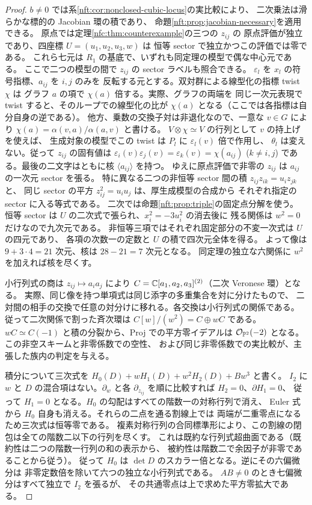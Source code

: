 \begin{proof}
$b\ne0$ では系\ref{nft:cor:nonclosed-cubic-locus}の実比較により、
二次乗法は滑らかな標的の Jacobian 環の積であり、
命題\ref{nft:prop:jacobian-necessary}を適用できる。
原点では定理\ref{nfc:thm:counterexample}の三つの $z_{ij}$ の
原点評価が独立であり、四座標 $U=(u_1,u_2,u_3,w)$ は
恒等 sector で独立かつこの評価では零である。
これら七元は $R_1$ の基底で、いずれも同定理の模型で偶な中心元である。
ここで二つの模型の間で $z_{ij}$ の sector ラベルも照合できる。
$\varepsilon_l$ を $x_l$ の符号指標、$a_{ij}$ を $i,j$ のみを
反転する元とする。双対群による線型化の指標 twist $\chi$ は
グラフ $a$ の項で $\chi(a)$ 倍する。実際、グラフの両端を
同じ一次元表現で twist すると、そのループでの線型化の比が
$\chi(a)$ となる（ここでは各指標は自分自身の逆である）。
他方、乗数の交換子対は非退化なので、一意な $v\in G$ により
$\chi(a)=\alpha(v,a)/\alpha(a,v)$ と書ける。
$V\otimes\chi\simeq V$ の行列として $v$ の持上げを使えば、
生成対象の模型でこの twist は $P_l$ に $\varepsilon_l(v)$ 倍で作用し、
$\theta_l$ は変えない。従って $z_{ij}$ の固有値は
$\varepsilon_i(v)\varepsilon_j(v)=\varepsilon_k(v)=\chi(a_{ij})$
($k\ne i,j$) である。最後の二文字はともに核 $\langle a_{ij}\rangle$ を持つ。
ゆえに原点評価で非零の $z_{ij}$ は $a_{ij}$ の一次元 sector を張る。
特に異なる二つの非恒等 sector 間の積 $z_{ij}z_{ik}=u_i z_{jk}$ と、
同じ sector の平方 $z_{ij}^2=u_i u_j$ は、厚生成模型の合成から
それぞれ指定の sector に入る等式である。
二次では命題\ref{nft:prop:triple}の固定点分解を使う。
恒等 sector は $U$ の二次式で張られ、$x_i^2=-3u_i^2$ の消去後に
残る関係は $w^2=0$ だけなので九次元である。
非恒等三項ではそれぞれ固定部分の不変一次式は $U$ の四元であり、
各項の次数一の定数と $U$ の積で四次元全体を得る。
よって像は $9+3\cdot4=21$ 次元、核は $28-21=7$ 次元となる。
同定理の独立な六関係に $w^2$ を加えれば核を尽くす。

小行列式の商は $z_{ij}\mapsto a_i a_j$ により
$C=\mathbb C[a_1,a_2,a_3]^{(2)}$（二次 Veronese 環）となる。
実際、同じ像を持つ単項式は同じ添字の多重集合を対に分けたもので、
二対間の相手の交換で任意の対分けに移れる。各交換は小行列式の関係である。
従って二次関係で割った斉次環は $C[w]/(w^2)=C\oplus wC$ である。
$wC\simeq C(-1)$ と積の分裂から、Proj での平方零イデアルは
$\mathcal O_{\mathbb P^2}(-2)$ となる。この非空スキームと非零係数での空性、
および同じ非零係数での実比較が、主張した族内の判定を与える。

積分について三次式を $H_0(D)+wH_1(D)+w^2H_2(D)+Bw^3$ と書く。
$I_2$ に $w$ と $D$ の混合項はない。$\partial_w$ と各
$\partial_{z_{ij}}$ を順に比較すれば $H_2=0$、$\partial H_1=0$、
従って $H_1=0$ となる。$H_0$ の勾配はすべての階数一の対称行列で消え、
Euler 式から $H_0$ 自身も消える。それらの二点を通る割線上では
両端が二重零点になるため三次式は恒等零である。
複素対称行列の合同標準形により、この割線の閉包は全ての階数二以下の行列を尽くす。
これは既約な行列式超曲面である（既約性は二つの階数一行列の和の表示から、
被約性は階数二で余因子が非零であることから従う）。
従って $H_0$ は $\det D$ のスカラー倍となる。逆にその六偏微分は
非零定数倍を除いて六つの独立な小行列式である。
$AB\ne0$ のとき七偏微分はすべて独立で $I_2$ を張るが、
その共通零点は上で求めた平方零拡大である。
\end{proof}

